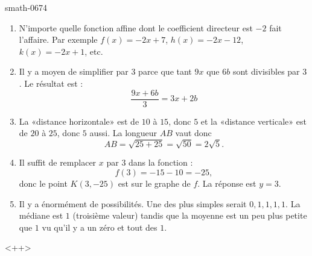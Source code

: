 
\begin{corrige}{smath-0674}

    \begin{enumerate}
        \item
            N'importe quelle fonction affine dont le coefficient directeur est \( -2\) fait l'affaire. Par exemple \( f(x)=-2x+7\), \( h(x)=-2x-12\), \( k(x)=-2x+1\), etc.
        \item
            Il y a moyen de simplifier par \( 3\) parce que tant \( 9x\) que \( 6b\) sont divisibles par \( 3\). Le résultat est :
            \begin{equation}
                \frac{ 9x+6b }{ 3 }=3x+2b
            \end{equation}
        \item
            La «distance horizontale» est de \( 10\) à \( 15\), donc \( 5\) et la «distance verticale» est de \( 20\) à \( 25\), donc \( 5\) aussi. La longueur \( AB\) vaut donc
            \begin{equation}
                AB=\sqrt{25+25}=\sqrt{50}=2\sqrt{5}.
            \end{equation}
        \item
            Il suffit de remplacer \( x\) par \( 3\) dans la fonction : 
            \begin{equation}
                f(3)=-15-10=-25,
            \end{equation}
            donc le point \( K(3,-25) \) est sur le graphe de \( f\). La réponse est \( y=3\).
        \item
            Il y a énormément de possibilités. Une des plus simples serait \( 0,1,1,1,1\). La médiane est \( 1\) (troisième valeur) tandis que la moyenne est un peu plus petite que \( 1\) vu qu'il y a un zéro et tout des \( 1\).
    \end{enumerate}
    <++>

\end{corrige}

